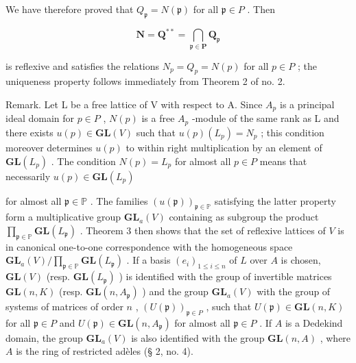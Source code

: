 We have therefore proved that \(Q_{\mathfrak{p}} = N(\mathfrak{p})\) for all \(\mathfrak{p} \in P\) . Then

\[
\mathbf {N} = \mathbf {Q} ^ {* *} = \bigcap_ {\mathfrak {p} \in \mathbf {P}} \mathbf {Q} _ {\mathfrak {p}}
\]

is reflexive and satisfies the relations \(N_{p} = Q_{p} = N(p)\) for all \(p \in P\) ; the uniqueness property follows immediately from Theorem 2 of no. 2.

Remark. Let L be a free lattice of V with respect to A. Since \(A_{p}\) is a principal ideal domain for \(p \in P\) , \(N(p)\) is a free \(A_{p}\) -module of the same rank as L and there exists \(u(p) \in \mathbf{GL}(V)\) such that \(u(p)(L_{p}) = N_{p}\) ; this condition moreover determines \(u(p)\) to within right multiplication by an element of \(\mathbf{GL}(L_{p})\) . The condition \(N(p) = L_{p}\) for almost all \(p \in P\) means that necessarily \(u(p) \in \mathbf{GL}(L_{p})\)

for almost all \(\mathfrak{p} \in \mathbb{P}\) . The families \((u(\mathfrak{p}))_{\mathfrak{p} \in \mathbb{P}}\) satisfying the latter property form a multiplicative group \(\mathbf{GL}_a(V)\) containing as subgroup the product \(\prod_{\mathfrak{p} \in \mathbb{P}} \mathbf{GL}(L_{\mathfrak{p}})\) . Theorem 3 then shows that the set of reflexive lattices of \(V\) is in canonical one-to-one correspondence with the homogeneous space \(\mathbf{GL}_a(V)/\prod_{\mathfrak{p} \in \mathbb{P}} \mathbf{GL}(L_{\mathfrak{p}})\) . If a basis \((e_i)_{1 \leq i \leq n}\) of \(L\) over \(A\) is chosen, \(\mathbf{GL}(V)\) (resp. \(\mathbf{GL}(L_{\mathfrak{p}})\) ) is identified with the group of invertible matrices \(\mathbf{GL}(n, K)\) (resp. \(\mathbf{GL}(n, A_{\mathfrak{p}})\) ) and the group \(\mathbf{GL}_a(V)\) with the group of systems of matrices of order \(n\) , \((U(\mathfrak{p}))_{\mathfrak{p} \in P}\) , such that \(U(\mathfrak{p}) \in \mathbf{GL}(n, K)\) for all \(\mathfrak{p} \in P\) and \(U(\mathfrak{p}) \in \mathbf{GL}(n, A_{\mathfrak{p}})\) for almost all \(\mathfrak{p} \in P\) . If \(A\) is a Dedekind domain, the group \(\mathbf{GL}_a(V)\) is also identified with the group \(\mathbf{GL}(n, A)\) , where \(A\) is the ring of restricted adèles (§ 2, no. 4).


